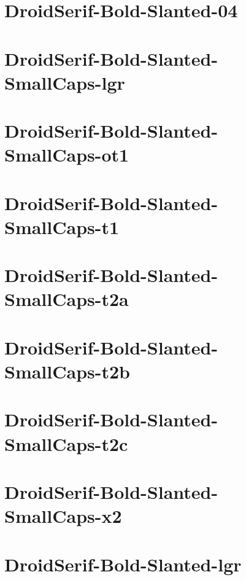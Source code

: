 \documentclass{article}
\begin{document}
\section{DroidSerif-Bold-Slanted-04}

\section{DroidSerif-Bold-Slanted-SmallCaps-lgr}

\section{DroidSerif-Bold-Slanted-SmallCaps-ot1}

\section{DroidSerif-Bold-Slanted-SmallCaps-t1}

\section{DroidSerif-Bold-Slanted-SmallCaps-t2a}

\section{DroidSerif-Bold-Slanted-SmallCaps-t2b}

\section{DroidSerif-Bold-Slanted-SmallCaps-t2c}

\section{DroidSerif-Bold-Slanted-SmallCaps-x2}

\section{DroidSerif-Bold-Slanted-lgr}
\end{document}

